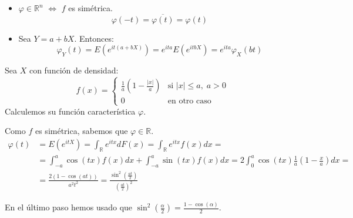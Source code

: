 \begin{properties}
    \hfill
    \begin{itemize}
        \item $\varphi \in \mathbb{R}^n$ $\Leftrightarrow$ $f$ es simétrica.
              $$\varphi(-t) = \overline{\varphi(t)} = \varphi(t)$$
        \item Sea $Y = a + bX$. Entonces:
              $$\varphi_Y(t) = E(e^{it(a+bX)}) = e^{ita} E(e^{itbX}) = e^{ita} \varphi_X(bt)$$
    \end{itemize}
\end{properties}

\begin{exercise}
    Sea $X$ con función de densidad:
    $$f(x) = \begin{cases}
            \frac{1}{a} \left(1 - \frac{|x|}{a}\right) & \text{si } |x| \leq a, \; a > 0 \\
            0                                          & \text{en otro caso}
        \end{cases}$$
    Calculemos su función característica $\varphi$.

    Como $f$ es simétrica, sabemos que $\varphi \in \mathbb{R}$.
    \begin{align*}
        \varphi(t) & = E(e^{itX}) = \int_\mathbb{R} e^{itx}dF(x) = \int_\mathbb{R} e^{itx}f(x)dx =                                           \\
                   & = \int_{-a}^a \cos(tx)f(x)dx + \int_{-a}^a \sin(tx)f(x)dx = 2\int_0^a \cos(tx)\frac{1}{a}\left(1-\frac{x}{a}\right)dx = \\
                   & = \frac{2(1-\cos(at))}{a^2t^2} = \frac{\sin^2\left(\frac{at}{2}\right)}{\left(\frac{at}{2}\right)^2}
    \end{align*}

    En el último paso hemos usado que $\sin^2(\frac{\alpha}{2}) = \frac{1-\cos(\alpha)}{2}$.
\end{exercise}

